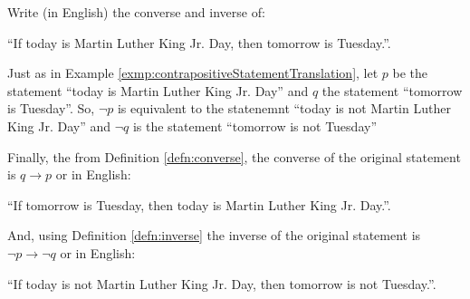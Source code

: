 \guard






\begin{exmp}
\label{exmp:converseInverseStatementTranslation}
  Write (in English) the converse and inverse of:
  \begin{center}
      ``If today is Martin Luther King Jr. Day, then tomorrow is Tuesday.''.
  \end{center}

  Just as in Example \ref{exmp:contrapositiveStatementTranslation}, let $p$ be the statement ``today is Martin Luther King Jr. Day'' and $q$ the statement ``tomorrow is Tuesday''.
  So, $\neg p$ is equivalent to the statenemnt ``today is not Martin Luther King Jr. Day'' and $\neg q$ is the statement ``tomorrow is not Tuesday''

  Finally, the from Definition \ref{defn:converse}, the converse of the original statement is $q \rightarrow p$ or in English:
  \begin{center}
      ``If tomorrow is Tuesday, then today is Martin Luther King Jr. Day.''.
  \end{center}
  And, using Definition \ref{defn:inverse} the inverse of the original statement is $\neg p \rightarrow \neg q$ or in English:
  \begin{center}
      ``If today is not Martin Luther King Jr. Day, then tomorrow is not Tuesday.''.
  \end{center}
\end{exmp}
